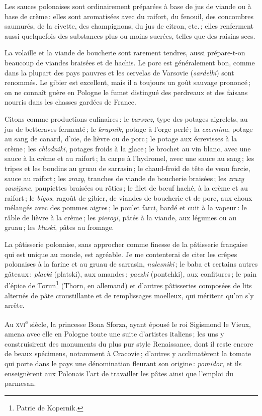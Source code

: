 Les sauces polonaises sont ordinairement préparées à base de jus de viande ou
à base de crème : elles sont aromatisées avec du raifort, du fenouil, des
concombres saumurés, de la civette, des champignons, du jus de citron, etc. ;
elles renferment aussi quelquefois des substances plus ou moins sucrées, telles
que des raisins secs.

La volaille et la viande de boucherie sont rarement tendres, aussi prépare-t-on
beaucoup de viandes braisées et de hachis. Le porc est généralement bon, comme
dans la plupart des pays pauvres et les cervelas de Varsovie
(\textit{sardelki}) sont renommés. Le gibier est excellent, mais il a toujours
un goût sauvage prononcé ; on ne connaît guère en Pologne le fumet distingué
des perdreaux et des faisans nourris dans les chasses gardées de France.

Citons comme productions culinaires : le \textit{barszcz}, type des potages
aigrelets, au jus de betteraves fermenté ; le \textit{krupnik}, potage à l'orge
perlé ; la \textit{czernina}, potage au sang de canard, d'oie, de lièvre ou de
porc ; le potage aux écrevisses à la crème ; les \textit{chlodniki}, potages
froids à la glace ; le brochet au vin blanc, avec une sauce à la crème et au
raifort ; la carpe à l'hydromel, avec une sauce au sang ; les tripes et les
boudins au gruau de sarrasin ; le chaud-froid de tête de veau farcie, sauce au
raifort ; les \textit{zrazy}, tranches de viande de boucherie braisées ; les
\textit{zrazy zawijane}, paupiettes braisées ou rôties ; le filet de bœuf
haché, à la crème et au raifort ; le \textit{bigos}, ragoût de gibier, de
viandes de boucherie et de porc, aux choux mélangés avec des pommes aigres ; le
poulet farci, bardé et cuit à la vapeur : le râble de lièvre à la crème ; les
\textit{pierogi}, pâtés à la viande, aux légumes ou au gruau ; les
\textit{kluski}, pâtes au fromage.

La pâtisserie polonaise, sans approcher comme finesse de la pâtisserie
française qui est unique au monde, est agréable. Je me contenterai de citer les
crêpes polonaises à la farine et au gruau de sarrasin, \textit{nalesniki} ; le
baba et certains autres gâteaux : \textit{placki} (platski), aux amandes ;
\textit{paczki} (pontchki), aux confitures ; le pain d'épice de
Torun\footnote{Patrie de Kopernik.} (Thorn, en allemand) et d'autres
pâtisseries composées de lits alternés de pâte croustillante et de remplissages
moelleux, qui méritent qu'on s'y arrête.

Au \textsc{xvi}\textsuperscript{e} siècle, la princesse Bona Sforza, ayant
épousé le roi Sigismond le Vieux, amena avec elle en Pologne toute une suite
d'artistes italiens ; les uns y construisirent des monuments du plus pur style
Renaissance, dont il reste encore de beaux spécimens, notamment à Cracovie ;
d'autres y acclimatèrent la tomate qui porte dans le pays une dénomination
fleurant son origine : \textit{pomidor}, et ils enseignèrent aux Polonais l'art
de travailler les pâtes ainsi que l'emploi du parmesan.

